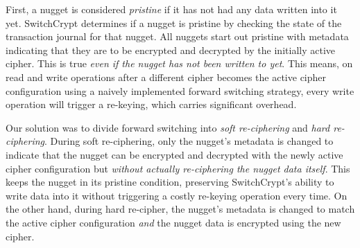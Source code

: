 First, a nugget is considered \emph{pristine} if it has not had any data written
into it yet. SwitchCrypt determines if a nugget is pristine by checking the
state of the transaction journal for that nugget. All nuggets start out pristine
with metadata indicating that they are to be encrypted and decrypted by the
initially active cipher. This is true \emph{even if the nugget has not been
written to yet}. This means, on read and write operations after a different
cipher becomes the active cipher configuration using a naively implemented
forward switching strategy, every write operation will trigger a re-keying,
which carries significant overhead.

Our solution was to divide forward switching into \emph{soft re-ciphering} and
\emph{hard re-ciphering}. During soft re-ciphering, only the nugget's metadata
is changed to indicate that the nugget can be encrypted and decrypted with the
newly active cipher configuration but \emph{without actually re-ciphering the
nugget data itself}. This keeps the nugget in its pristine condition, preserving
SwitchCrypt's ability to write data into it without triggering a costly
re-keying operation every time. On the other hand, during hard re-cipher, the
nugget's metadata is changed to match the active cipher configuration \emph{and}
the nugget data is encrypted using the new cipher.


